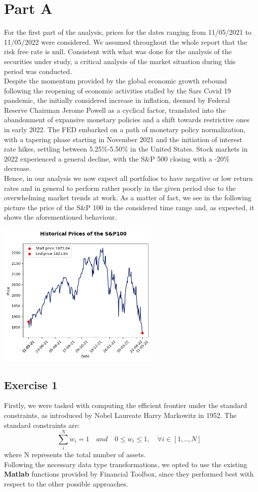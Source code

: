 \documentclass{assignment}
\begin{document}
\section*{Part A}
For the first part of the analysis, prices for the dates ranging from 11/05/2021 to 11/05/2022 were
considered. We assumed throughout the whole report that the risk free rate is null. Consistent with
what was done for the analysis of the securities under study, a critical analysis of the market
situation during this period was conducted.\\
Despite the momentum provided by the global economic growth rebound following the reopening of
economic activities stalled by the Sars Covid 19 pandemic, the initially considered increase in
inflation, deemed by Federal Reserve Chairman Jerome Powell as a cyclical factor, translated into
the abandonment of expansive monetary policies and a shift towards restrictive ones in early 2022.
The FED embarked on a path of monetary policy normalization, with a tapering phase starting in
November 2021 and the initiation of interest rate hikes, settling between 5.25\%-5.50\% in the
United States. Stock markets in 2022 experienced a general decline, with the S\&P 500 closing with
a -20\% decrease.\\
Hence, in our analysis we now expect all portfolios to have negative or low return rates and in
general to perform rather poorly in the given period due to the overwhelming market trends at work.
As a matter of fact, we see in the following picture the price of the S\&P 100 in the considered
time range and, as expected, it shows the aforementioned behaviour.
\begin{center}
    \includegraphics[height=7cm]{assets/Unknown-12.png}
\end{center}

\subsection*{Exercise 1}
Firstly, we were tasked with computing the efficient frontier under the standard constraints, as
introduced by Nobel Laureate Harry Markowitz in 1952. The standard constraints are: 
\[
    \sum_{i}^{N}{w_{i}} = 1 \quad and \quad
    0\leq w_i \leq 1 ,\quad  \forall i\in \left [ 1,..,N \right ]  
\]
where N represents the total number of assets.\\ 
Following the necessary data type transformations, we opted to use the existing \textbf{Matlab}
functions provided by Financial Toolbox, since they performed best with respect to the other
possible approaches.
\end{document}
